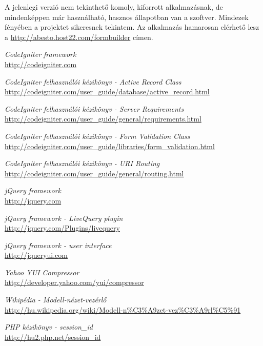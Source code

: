 \documentclass[12pt,a4paper,twoside]{article}
\begin{document}
A jelenlegi verzió nem tekinthető komoly, kiforrott alkalmazásnak, de
mindenképpen már használható, hasznos állapotban van a szoftver. Mindezek
fényében a projektet sikeresnek tekintem. Az alkalmazás hamarosan elérhető lesz
a \url{http://abesto.host22.com/formbuilder} címen.

\clearpage
{}
{}
\begin{thebibliography}{99}

  \emph{CodeIgniter framework}\\
  \url{http://codeigniter.com}

  \emph{CodeIgniter felhasználói kézikönyv - Active Record Class}\\
  \url{http://codeigniter.com/user_guide/database/active_record.html}

  \emph{CodeIgniter felhasználói kézikönyv - Server Requirements}\\
  \url{http://codeigniter.com/user_guide/general/requirements.html}

  \emph{CodeIgniter felhasználói kézikönyv - Form Validation Class}\\
  \url{http://codeigniter.com/user_guide/libraries/form_validation.html}

  \emph{CodeIgniter felhasználói kézikönyv - URI Routing}\\
  \url{http://codeigniter.com/user_guide/general/routing.html}

  \emph{jQuery framework}\\
  \url{http://jquery.com}

  \emph{jQuery framework - LiveQuery plugin}\\
  \url{http://jquery.com/Plugins/livequery}

  \emph{jQuery framework - user interface}\\
  \url{http://jqueryui.com}

  \emph{Yahoo YUI Compressor}\\
  \url{http://developer.yahoo.com/yui/compressor}

  \emph{Wikipédia - Modell-nézet-vezérlő}\\
  \url{http://hu.wikipedia.org/wiki/Modell-n\%C3\%A9zet-vez\%C3\%A9rl\%C5\%91}

  \emph{PHP kézikönyv - session\_id}\\
  \url{http://hu2.php.net/session_id}


\end{thebibliography}
\end{document}
